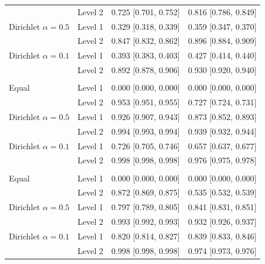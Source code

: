 \begin{tabular}{llcc}
 & Level 2 & 0.725 [0.701, 0.752] & 0.816 [0.786, 0.849] \\
Dirichlet $\alpha=0.5$ & Level 1 & 0.329 [0.318, 0.339] & 0.359 [0.347, 0.370] \\
 & Level 2 & 0.847 [0.832, 0.862] & 0.896 [0.884, 0.909] \\
Dirichlet $\alpha=0.1$ & Level 1 & 0.393 [0.383, 0.403] & 0.427 [0.414, 0.440] \\
 & Level 2 & 0.892 [0.878, 0.906] & 0.930 [0.920, 0.940] \\
\addlinespace
\multicolumn{4}{@{}l}{\textit{Heart, Random Forest}} \\
Equal & Level 1 & 0.000 [0.000, 0.000] & 0.000 [0.000, 0.000] \\
 & Level 2 & 0.953 [0.951, 0.955] & 0.727 [0.724, 0.731] \\
Dirichlet $\alpha=0.5$ & Level 1 & 0.926 [0.907, 0.943] & 0.873 [0.852, 0.893] \\
 & Level 2 & 0.994 [0.993, 0.994] & 0.939 [0.932, 0.944] \\
Dirichlet $\alpha=0.1$ & Level 1 & 0.726 [0.705, 0.746] & 0.657 [0.637, 0.677] \\
 & Level 2 & 0.998 [0.998, 0.998] & 0.976 [0.975, 0.978] \\
\addlinespace
\multicolumn{4}{@{}l}{\textit{Heart, XGBoost}} \\
Equal & Level 1 & 0.000 [0.000, 0.000] & 0.000 [0.000, 0.000] \\
 & Level 2 & 0.872 [0.869, 0.875] & 0.535 [0.532, 0.539] \\
Dirichlet $\alpha=0.5$ & Level 1 & 0.797 [0.789, 0.805] & 0.841 [0.831, 0.851] \\
 & Level 2 & 0.993 [0.992, 0.993] & 0.932 [0.926, 0.937] \\
Dirichlet $\alpha=0.1$ & Level 1 & 0.820 [0.814, 0.827] & 0.839 [0.833, 0.846] \\
 & Level 2 & 0.998 [0.998, 0.998] & 0.974 [0.973, 0.976] \\
\bottomrule
\end{tabular}
